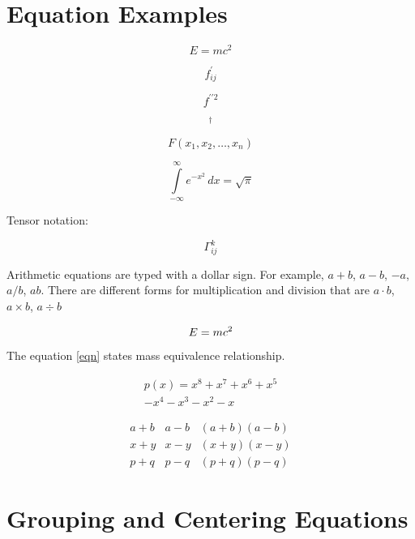 \documentclass[]{article}
\title{}
\author{}
\begin{document}
\maketitle

\begin{abstract}

\end{abstract}

\section{Equation Examples}

\huge{
	\[ E = mc^2  \]
}

\[ f^{\prime}_{ij} \]

\[ f^{\prime \prime 2} \]

\[ {}^{\dagger} \]

\[ F(x_{1}, x_{2}, \dots, x_{n})  \]

\[ \int\limits_{-\infty}^{\infty} e^{-x^{2}} \, dx = \sqrt{\pi} \]


Tensor notation:

\[ \Gamma^{k}_{ij} \]


Arithmetic equations are typed with a dollar sign. For example, $a + b$, $a - b$, $-a$, $a / b$, $a b$. There are different forms for multiplication and division that are $a \cdot b$, $a \times b$, $a \div b$


\begin{equation} \label{eqn}
	\huge{E = {mc^2}}
\end{equation}

The equation \ref{eqn} states mass equivalence relationship.

\newpage



\begin{multline*}
	p(x) = x^8+x^7+x^6+x^5 \\
	- x^4 - x^3 - x^2 - x
\end{multline*}


\begin{align*}
	a+b        &     a-b              &  (a+b)(a-b)\\
	x+y         &  x-y   &  (x+y)(x-y)\\
	p+q   &  p-q          &  (p+q)(p-q)
\end{align*}


\section{Grouping and Centering Equations}
\end{document}

